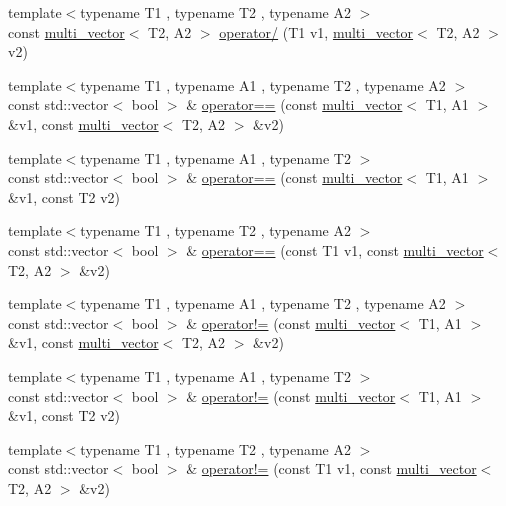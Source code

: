 \begin{DoxyCompactItemize}
{\footnotesize template$<$typename T1 , typename T2 , typename A2 $>$ }\\const \hyperlink{classIceBRG_1_1multi__vector}{multi\-\_\-vector}$<$ T2, A2 $>$ \hyperlink{namespaceIceBRG_ae69a8c98c2896391015340a87c07ae16}{operator/} (T1 v1, \hyperlink{classIceBRG_1_1multi__vector}{multi\-\_\-vector}$<$ T2, A2 $>$ v2)
\item 
{\footnotesize template$<$typename T1 , typename A1 , typename T2 , typename A2 $>$ }\\const std\-::vector$<$ bool $>$ \& \hyperlink{namespaceIceBRG_ad06312f2e05a9d4994ddaec243242500}{operator==} (const \hyperlink{classIceBRG_1_1multi__vector}{multi\-\_\-vector}$<$ T1, A1 $>$ \&v1, const \hyperlink{classIceBRG_1_1multi__vector}{multi\-\_\-vector}$<$ T2, A2 $>$ \&v2)
\item 
{\footnotesize template$<$typename T1 , typename A1 , typename T2 $>$ }\\const std\-::vector$<$ bool $>$ \& \hyperlink{namespaceIceBRG_a331262aa3c5a33293c68f35aee0350bd}{operator==} (const \hyperlink{classIceBRG_1_1multi__vector}{multi\-\_\-vector}$<$ T1, A1 $>$ \&v1, const T2 v2)
\item 
{\footnotesize template$<$typename T1 , typename T2 , typename A2 $>$ }\\const std\-::vector$<$ bool $>$ \& \hyperlink{namespaceIceBRG_aa6fa4a8424f5051ddbe4b39c77b698f5}{operator==} (const T1 v1, const \hyperlink{classIceBRG_1_1multi__vector}{multi\-\_\-vector}$<$ T2, A2 $>$ \&v2)
\item 
{\footnotesize template$<$typename T1 , typename A1 , typename T2 , typename A2 $>$ }\\const std\-::vector$<$ bool $>$ \& \hyperlink{namespaceIceBRG_a654d1bb4d81bda12ddfd3f1877e716b9}{operator!=} (const \hyperlink{classIceBRG_1_1multi__vector}{multi\-\_\-vector}$<$ T1, A1 $>$ \&v1, const \hyperlink{classIceBRG_1_1multi__vector}{multi\-\_\-vector}$<$ T2, A2 $>$ \&v2)
\item 
{\footnotesize template$<$typename T1 , typename A1 , typename T2 $>$ }\\const std\-::vector$<$ bool $>$ \& \hyperlink{namespaceIceBRG_acf8f5e81f304de50c114edfb923a980e}{operator!=} (const \hyperlink{classIceBRG_1_1multi__vector}{multi\-\_\-vector}$<$ T1, A1 $>$ \&v1, const T2 v2)
\item 
{\footnotesize template$<$typename T1 , typename T2 , typename A2 $>$ }\\const std\-::vector$<$ bool $>$ \& \hyperlink{namespaceIceBRG_a34f4a8f890be55fae2a455f900738a28}{operator!=} (const T1 v1, const \hyperlink{classIceBRG_1_1multi__vector}{multi\-\_\-vector}$<$ T2, A2 $>$ \&v2)

\end{DoxyCompactItemize}
